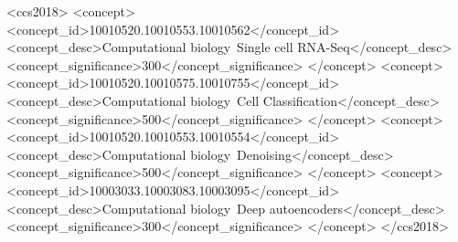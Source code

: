 \documentclass[sigconf]{acmart}
\begin{document}
%
%
\begin{CCSXML}
<ccs2018>
 <concept>
  <concept_id>10010520.10010553.10010562</concept_id>
  <concept_desc>Computational biology~Single cell RNA-Seq</concept_desc>
  <concept_significance>300</concept_significance>
 </concept>
 <concept>
  <concept_id>10010520.10010575.10010755</concept_id>
  <concept_desc>Computational biology~Cell Classification</concept_desc>
  <concept_significance>500</concept_significance>
 </concept>
 <concept>
  <concept_id>10010520.10010553.10010554</concept_id>
  <concept_desc>Computational biology~Denoising</concept_desc>
  <concept_significance>500</concept_significance>
 </concept>
 <concept>
  <concept_id>10003033.10003083.10003095</concept_id>
  <concept_desc>Computational biology~Deep autoencoders</concept_desc>
  <concept_significance>300</concept_significance>
 </concept>
</ccs2018>
\end{CCSXML}



\maketitle





\end{document}
